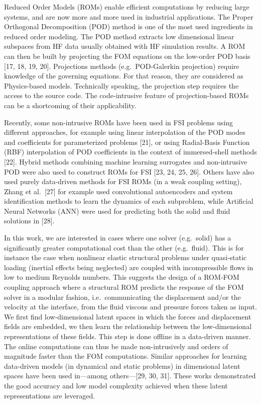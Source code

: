 \documentclass[11pt]{article}
\begin{document}
Reduced Order Models (ROMs) enable efficient computations by reducing large systems, and are now more and more used in industrial applications. The Proper Orthogonal Decomposition (POD) method is one of the most used ingredients in reduced order modeling. The POD method extracts low dimensional linear subspaces from HF data usually obtained with HF simulation results. A ROM can then be built by projecting the FOM equations on the low-order POD basis [17, 18, 19, 20]. Projections methods (e.g.\ POD-Galerkin projection) require knowledge of the governing equations. For that reason, they are considered as Physics-based models. Technically speaking, the projection step requires the access to the source code. The code-intrusive feature of projection-based ROMs can be a shortcoming of their applicability.

Recently, some non-intrusive ROMs have been used in FSI problems using different approaches, for example using linear interpolation of the POD modes and coefficients for parameterized problems [21], or using Radial-Basis Function (RBF) interpolation of POD coefficients in the context of immersed-shell methods [22]. Hybrid methods combining machine learning surrogates and non-intrusive POD were also used to construct ROMs for FSI [23, 24, 25, 26]. Others have also used purely data-driven methods for FSI ROMs (in a weak coupling setting), Zhang et al.\ [27] for example used convolutional autoencoders and system identification methods to learn the dynamics of each subproblem, while Artificial Neural Networks (ANN) were used for predicting both the solid and fluid solutions in [28].

In this work, we are interested in cases where one solver (e.g.\ solid) has a significantly greater computational cost than the other (e.g.\ fluid). This is for instance the case when nonlinear elastic structural problems under quasi-static loading (inertial effects being neglected) are coupled with incompressible flows in low to medium Reynolds numbers. This suggests the design of a ROM-FOM coupling approach where a structural ROM predicts the response of the FOM solver in a modular fashion, i.e.\ communicating the displacement and/or the velocity at the interface, from the fluid viscous and pressure forces taken as input. We first find low-dimensional latent spaces in which the forces and displacement fields are embedded, we then learn the relationship between the low-dimensional representations of these fields. This step is done offline in a data-driven manner. The online computations can thus be made non-intrusively and orders of magnitude faster than the FOM computations. Similar approaches for learning data-driven models (in dynamical and static problems) in dimensional latent spaces have been used in---among others---[29, 30, 31]. These works demonstrated the good accuracy and low model complexity achieved when these latent representations are leveraged.
\end{document}
